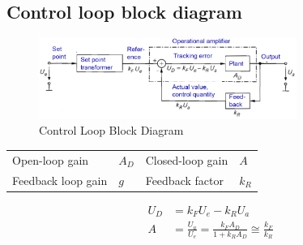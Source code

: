	
	\subsection{Control loop block diagram}
		\begin{figure}[h]
			\centering
			\includegraphics[width=0.75\textwidth]{images/ControlLoopDiagram.png}
			\caption{Control Loop Block Diagram}
			\label{Fig:ControlLoopDiagram}
		\end{figure}
	
		\begin{table}[htbp]
			\centering
			\begin{tabular}{llll}
				Open-loop gain & $A_D$ & Closed-loop gain & $A$\\
				Feedback loop gain & $g$ & Feedback factor & $k_R$\\
			\end{tabular}
		\end{table}
		
		\begin{align}
			U_D &= k_F U_e - k_R U_a \\
			A &= \frac{U_a}{U_e} = \frac{k_F A_D}{1 + k_R A_D} \cong \frac{k_F}{k_R}
		\end{align}
	

